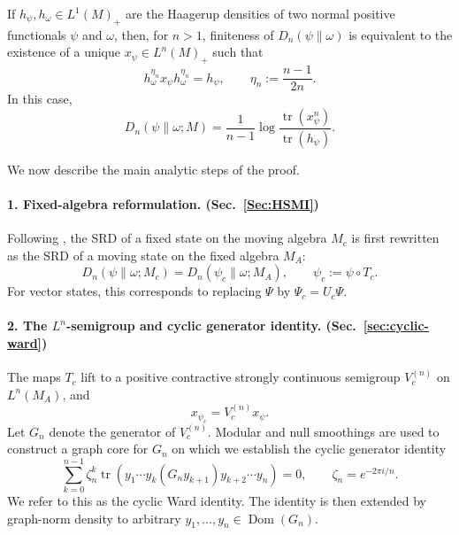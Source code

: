 \documentclass[11pt,a4paper]{article}
\theoremstyle{plain}
\numberwithin{theorem}{section}
\theoremstyle{definition}
\newcommand{\?}{\overset{?}{=}}
\DeclareMathOperator{\tr}{tr}
\begin{document}
If
\(h_\psi,h_\omega\in L^1(M)_+\) are the Haagerup densities of two normal
positive functionals \(\psi\) and \(\omega\), then, for \(n>1\), finiteness
of \(D_n(\psi\|\omega)\) is equivalent to the existence of a unique
\(x_\psi\in L^n(M)_+\) such that
\begin{equation}\label{eq:intro-kosaki-representative}
        h_\omega^{\eta_n}
        x_\psi
        h_\omega^{\eta_n}
        =
        h_\psi,
        \qquad
        \eta_n:=\frac{n-1}{2n}.
\end{equation}
In this case,
\begin{equation}\label{eq:intro-SRD-Haagerup}
        D_n(\psi\|\omega;M)
        =
        \frac{1}{n-1}
        \log
        \frac{\tr(x_\psi^n)}{\tr(h_\psi)}.
\end{equation}

We now describe the main analytic steps of the proof.

\paragraph*{1. Fixed-algebra reformulation. (Sec.~\ref{Sec:HSMI})}
Following \cite{Hollands:2025glm}, the SRD of a fixed state on the moving algebra
\(M_c\) is first rewritten as the SRD of a moving state on the fixed
algebra \(M_A\):
\begin{equation}
        D_n(\psi\|\omega;M_c)
        =
        D_n(\psi_c\|\omega;M_A),
        \qquad
        \psi_c:=\psi\circ T_c.
\end{equation}
For vector states, this corresponds to replacing \(\Psi\) by
\(\Psi_c=U_c\Psi\).

\paragraph*{2. The \(L^n\)-semigroup and cyclic generator identity. (Sec.~\ref{sec:cyclic-ward})}
The maps \(T_c\) lift to a positive contractive strongly continuous
semigroup \(V_c^{(n)}\) on \(L^n(M_A)\), and
\begin{equation}
        x_{\psi_c}=V_c^{(n)}x_\psi.
\end{equation}
Let \(G_n\) denote the generator of \(V_c^{(n)}\).  Modular and null
smoothings are used to construct a graph core for \(G_n\) on which we establish the cyclic
generator identity
\begin{equation}\label{eq:intro-cyclic-Ward}
        \sum_{k=0}^{n-1}
        \zeta_n^k
        \tr\left(
        y_1\cdots y_k
        (G_ny_{k+1})
        y_{k+2}\cdots y_n
        \right)
        =
        0,
        \qquad
        \zeta_n=e^{-2\pi i/n}.
\end{equation}
We refer to this as the cyclic Ward identity.
The identity is then extended
by graph-norm density to arbitrary
\(y_1,\ldots,y_n\in\operatorname{Dom}(G_n)\).
\end{document}
